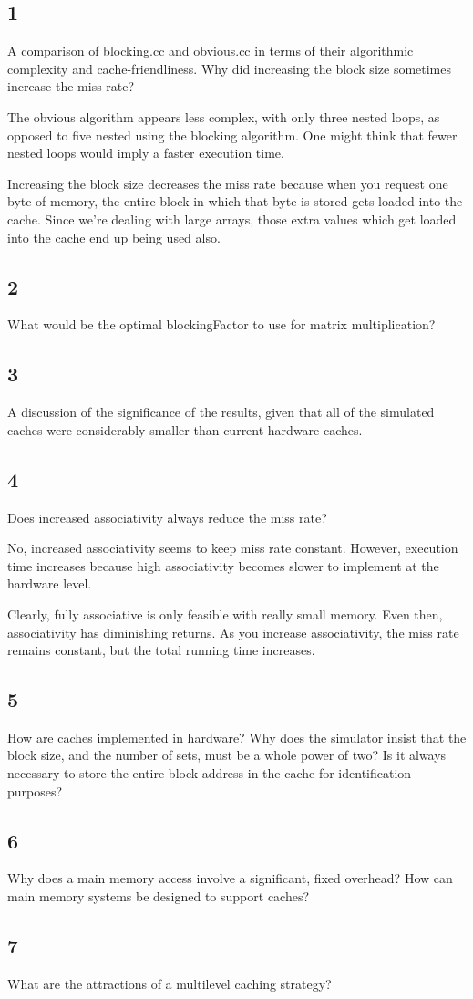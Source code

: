 \documentclass[letterpaper, 12pt, oneside]{memoir}
\begin{document}
\subsection{1}
A comparison of blocking.cc and obvious.cc in terms of their algorithmic 
complexity and cache-friendliness. Why did increasing the block size sometimes 
increase the miss rate?

The obvious algorithm appears less complex, with only three nested loops, as
opposed to five nested using the blocking algorithm. One might think that
fewer nested loops would imply a faster execution time. 


Increasing the block size decreases the miss rate because when you request
one byte of memory, the entire block in which that byte is stored gets loaded
into the cache. Since we're dealing with large arrays, those extra values which
get loaded into the cache end up being used also.


\subsection{2}
What would be the optimal blockingFactor to use for matrix multiplication?


\subsection{3}
A discussion of the significance of the results, given that all of the simulated
caches were considerably smaller than current hardware caches.


\subsection{4}
Does increased associativity always reduce the miss rate?

No, increased associativity seems to keep miss rate constant. However, execution
time increases because high associativity becomes slower to implement at 
the hardware level.

Clearly, fully associative is only feasible with really small memory. Even then, 
associativity has diminishing returns. As you increase associativity, the miss
rate remains constant, but the total running time increases.

\subsection{5}
How are caches implemented in hardware? Why does the simulator insist that the
block size, and the number of sets, must be a whole power of two? Is it always
necessary to store the entire block address in the cache for identification purposes?


\subsection{6}
Why does a main memory access involve a significant, fixed overhead? How can 
main memory systems be designed to support caches?


\subsection{7}
What are the attractions of a multilevel caching strategy?
\end{document}
